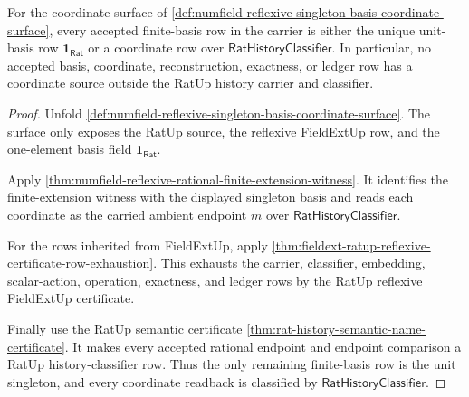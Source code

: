 \begin{theorem}
\label{thm:numfield-reflexive-singleton-basis-exhaustion}
For the coordinate surface of
\autoref{def:numfield-reflexive-singleton-basis-coordinate-surface}, every
accepted finite-basis row in the carrier is either the unique unit-basis row
$\mathbf{1}_{\mathsf{Rat}}$ or a coordinate row over
$\mathsf{RatHistoryClassifier}$. In particular, no accepted basis,
coordinate, reconstruction, exactness, or ledger row has a coordinate source
outside the RatUp history carrier and classifier.
\end{theorem}
\begin{proof}
Unfold
\autoref{def:numfield-reflexive-singleton-basis-coordinate-surface}. The
surface only exposes the RatUp source, the reflexive FieldExtUp row, and the
one-element basis field $\mathbf{1}_{\mathsf{Rat}}$.

Apply
\autoref{thm:numfield-reflexive-rational-finite-extension-witness}. It
identifies the finite-extension witness with the displayed singleton basis and
reads each coordinate as the carried ambient endpoint $m$ over
$\mathsf{RatHistoryClassifier}$.

For the rows inherited from FieldExtUp, apply
\autoref{thm:fieldext-ratup-reflexive-certificate-row-exhaustion}. This
exhausts the carrier, classifier, embedding, scalar-action, operation,
exactness, and ledger rows by the RatUp reflexive FieldExtUp certificate.

Finally use the RatUp semantic certificate
\autoref{thm:rat-history-semantic-name-certificate}. It makes every accepted
rational endpoint and endpoint comparison a RatUp history-classifier row.
Thus the only remaining finite-basis row is the unit singleton, and every
coordinate readback is classified by $\mathsf{RatHistoryClassifier}$.
\end{proof}

